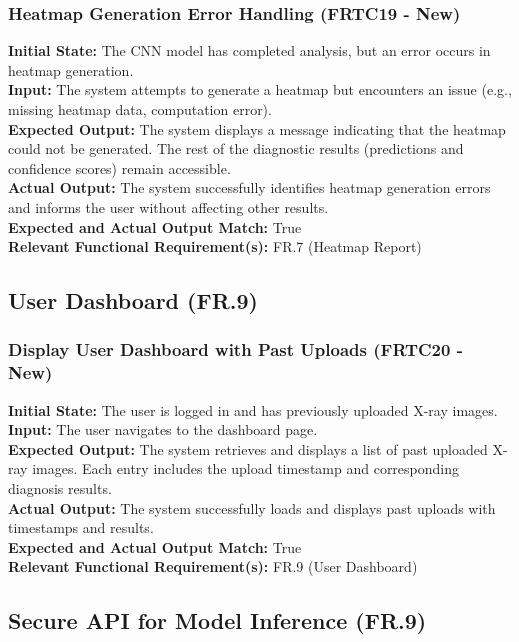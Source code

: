 \documentclass[12pt, titlepage]{article}
\begin{document}
\subsubsection{Heatmap Generation Error Handling (FRTC19 - New)}
\textbf{Initial State:} The CNN model has completed analysis, but an error occurs in heatmap generation.\\
\textbf{Input:} The system attempts to generate a heatmap but encounters an issue (e.g., missing heatmap data, computation error).\\
\textbf{Expected Output:} The system displays a message indicating that the heatmap could not be generated. The rest of the diagnostic results (predictions and confidence scores) remain accessible.\\
\textbf{Actual Output:} The system successfully identifies heatmap generation errors and informs the user without affecting other results.\\
\textbf{Expected and Actual Output Match:} True\\
\textbf{Relevant Functional Requirement(s):} FR.7 (Heatmap Report)\\

\subsection{User Dashboard (FR.9)}
\subsubsection{Display User Dashboard with Past Uploads (FRTC20 - New)}
\textbf{Initial State:} The user is logged in and has previously uploaded X-ray images.\\
\textbf{Input:} The user navigates to the dashboard page.\\
\textbf{Expected Output:} The system retrieves and displays a list of past uploaded X-ray images. Each entry includes the upload timestamp and corresponding diagnosis results.\\
\textbf{Actual Output:} The system successfully loads and displays past uploads with timestamps and results.\\
\textbf{Expected and Actual Output Match:} True\\
\textbf{Relevant Functional Requirement(s):} FR.9 (User Dashboard)\\

\subsection{Secure API for Model Inference (FR.9)}
\end{document}

